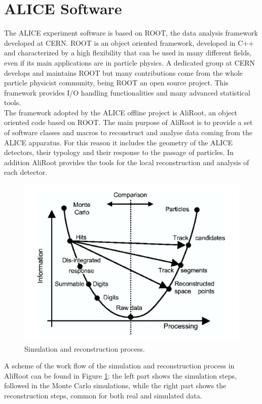 \section{ALICE Software}
The ALICE experiment software is based on ROOT, the data analysis framework developed at CERN. ROOT is an object oriented framework, developed in C++ and characterized by a high flexibility that can be used in many different fields, even if its main applications are in particle physics. A dedicated group at CERN develops and maintains ROOT but many contributions come from the whole particle physicist community, being ROOT an open source project. This framework provides I/O handling functionalities and many advanced statistical tools.\\
The framework adopted by the ALICE offline project is AliRoot, an object oriented code based on ROOT. The main purpose of AliRoot is to provide a set of software classes and macros to reconstruct and analyse data coming from the ALICE apparatus. For this reason it includes the geometry of the ALICE detectors, their typology and their response to the passage of particles. In addition AliRoot provides the tools for the local reconstruction and analysis of each detector.\\
\begin{figure}
  \centering
  \includegraphics[scale=0.30]{figures/reconstruction.png}
  \caption{Simulation and reconstruction process.}
  \label{fig:Rec}
\end{figure}
%
A scheme of the work flow of the simulation and reconstruction process in AliRoot can be found in Figure \ref{fig:Rec}: the left part shows the simulation steps, followed in the Monte Carlo simulations, while the right part shows the reconstruction steps, common for both real and simulated data.\\
